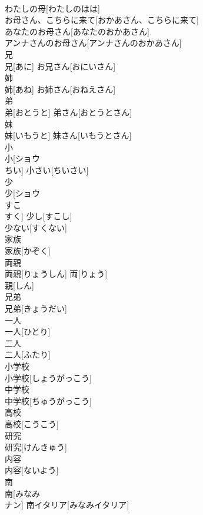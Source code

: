\documentclass[8pt]{extreport}
\begin{document}
\begin{CJK}{UTF8}{min}
\\	わたしの母[わたしのはは] 
\\	お母さん、こちらに来て[おかあさん、こちらに来て] 
\\	あなたのお母さん[あなたのおかあさん] 
\\	アンナさんのお母さん[アンナさんのおかあさん] 
\\	兄	
\\	兄[あに]	お兄さん[おにいさん] 
\\	姉	
\\	姉[あね]	お姉さん[おねえさん] 
\\	弟	
\\	弟[おとうと]	弟さん[おとうとさん] 
\\	妹	
\\	妹[いもうと]	妹さん[いもうとさん] 
\\	小	
\\	小[ショウ 
\\	ちい]	小さい[ちいさい] 
\\	少	
\\	少[ショウ 
\\	すこ 
\\	すく]	少し[すこし] 
\\	少ない[すくない] 
\\	家族	
\\	家族[かぞく]	
\\	両親	
\\	両親[りょうしん]	両[りょう] 
\\	親[しん] 
\\	兄弟	
\\	兄弟[きょうだい]	
\\	一人	
\\	一人[ひとり]	
\\	二人	
\\	二人[ふたり]	
\\	小学校	
\\	小学校[しょうがっこう]	
\\	中学校	
\\	中学校[ちゅうがっこう]	
\\	高校	
\\	高校[こうこう]	
\\	研究	
\\	研究[けんきゅう]	
\\	内容	
\\	内容[ないよう]	
\\	南	
\\	南[みなみ 
\\	ナン]	南イタリア[みなみイタリア] 

\end{CJK}
\end{document}
